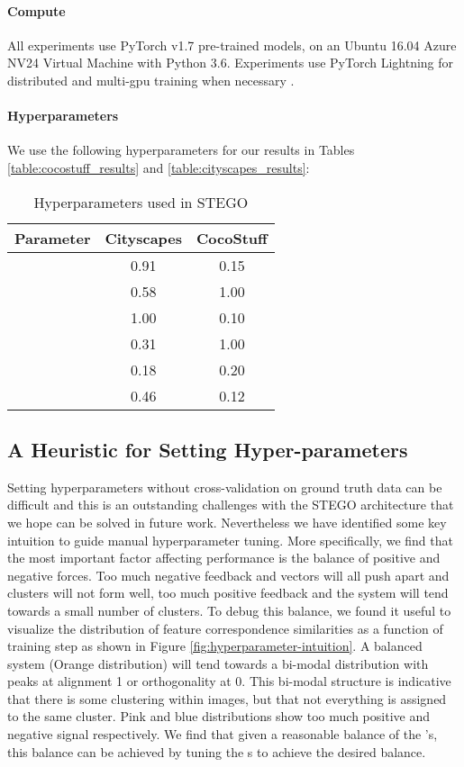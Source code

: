 \documentclass{article} \usepackage{iclr2022_conference,times}
\begin{document}
\paragraph{Compute} All experiments use PyTorch \citep{pytorch} v1.7 pre-trained models, on an Ubuntu 16.04 Azure NV24 Virtual Machine with Python 3.6. Experiments use PyTorch Lightning for distributed and multi-gpu training when necessary \citep{pytorch-lightning}.

\paragraph{Hyperparameters}
We use the following hyperparameters for our results in Tables \ref{table:cocostuff_results} and \ref{table:cityscapes_results}:


\begin{table}[h]
\caption{Hyperparameters used in STEGO}
\centering
\begin{tabular}{ccc}
\textbf{Parameter} & \textbf{Cityscapes} & \textbf{CocoStuff} \\ \hline
   & 0.91                & 0.15               \\
    & 0.58                & 1.00               \\
   & 1.00                & 0.10               \\
         & 0.31                & 1.00               \\
          & 0.18                & 0.20               \\
         & 0.46                & 0.12              
\end{tabular}
\end{table}

\newpage

\subsection{A Heuristic for Setting Hyper-parameters}

Setting hyperparameters without cross-validation on ground truth data can be difficult and this is an outstanding challenges with the STEGO architecture that we hope can be solved in future work. Nevertheless we have identified some key intuition to guide manual hyperparameter tuning. More specifically, we find that the most important factor affecting performance is the balance of positive and negative forces. Too much negative feedback and vectors will all push apart and clusters will not form well, too much positive feedback and the system will tend towards a small number of clusters. To debug this balance, we found it useful to visualize the distribution of feature correspondence similarities as a function of training step as shown in Figure \ref{fig:hyperparameter-intuition}. A balanced system (Orange distribution) will tend towards a bi-modal distribution with peaks at alignment 1 or orthogonality at 0. This bi-modal structure is indicative that there is some clustering within images, but that not everything is assigned to the same cluster. Pink and blue distributions show too much positive and negative signal respectively. We find that given a reasonable balance of the 's, this balance can be achieved by tuning the s to achieve the desired balance.
\end{document}
